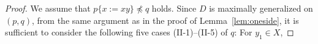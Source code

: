 \begin{proof}
We assume that $p \{ x := xy \} \not\preceq q$ holds. 
%
%
%
%
Since $D$ is maximally generalized on $(p,q)$, from the same argument as in the proof of Lemma~\ref{lem:oneside}, it is sufficient to consider the following five cases (II-1)--(II-5) of $q$: For $y_{1} \in X$,


\end{proof}
